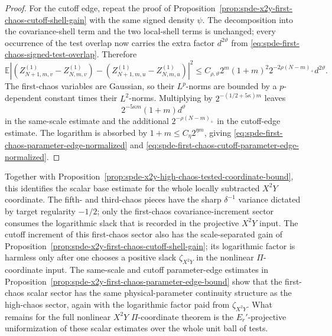 \begin{proof}
For the cutoff edge, repeat the proof of
Proposition~\ref{prop:spde-x2y-first-chaos-cutoff-shell-gain} with the same
signed density \(\psi\).  The decomposition into the covariance-shell term
and the two local-shell terms is unchanged; every occurrence of the test
overlap now carries the extra factor \(d^{2\vartheta}\) from
\eqref{eq:spde-first-chaos-signed-test-overlap}.  Therefore
\[
  \mathbb E
  \left|
      (Z_{N+1,m,v}^{(1)}-Z_{N,m,v}^{(1)})
      -(Z_{N+1,m,u}^{(1)}-Z_{N,m,u}^{(1)})
  \right|^2
  \leq
  C_{\rho,\vartheta}
  2^m(1+m)^2
  2^{-2\rho(N-m)_+}
  d^{2\vartheta}.
\]
The first-chaos variables are Gaussian, so their \(L^p\)-norms are bounded by
a \(p\)-dependent constant times their \(L^2\)-norms.  Multiplying by
\(2^{-(1/2+5\kappa)m}\) leaves
\[
  2^{-5\kappa m}(1+m)d^\vartheta
\]
in the same-scale estimate and the additional
\(2^{-\rho(N-m)_+}\) in the cutoff-edge estimate.  The logarithm is absorbed
by \(1+m\leq C_\eta2^{\eta m}\), giving
\eqref{eq:spde-first-chaos-parameter-edge-normalized} and
\eqref{eq:spde-first-chaos-cutoff-parameter-edge-normalized}.
\end{proof}

Together with
Proposition~\ref{prop:spde-x2y-high-chaos-tested-coordinate-bound}, this
identifies the scalar base estimate for the whole locally subtracted
\(X^2Y\) coordinate.  The fifth- and third-chaos pieces have the sharp
\(\delta^{-1}\) variance dictated by target regularity \(-1/2\); only the
first-chaos covariance-increment sector consumes the logarithmic slack that
is recorded in the projective \(X^2Y\) input.  The cutoff increment of this
first-chaos sector also has the scale-separated gain of
Proposition~\ref{prop:spde-x2y-first-chaos-cutoff-shell-gain}; its logarithmic
factor is harmless only after one chooses a positive slack
\(\zeta_{X^2Y}\) in the nonlinear \(\Pi\)-coordinate input.  The same-scale
and cutoff parameter-edge estimates in
Proposition~\ref{prop:spde-x2y-first-chaos-parameter-edge-bound} show that the
first-chaos scalar sector has the same physical-parameter continuity structure
as the high-chaos sector, again with the logarithmic factor paid from
\(\zeta_{X^2Y}\).  What remains for the full nonlinear
\(X^2Y\) \(\Pi\)-coordinate theorem is the \(E_r'\)-projective uniformization
of these scalar estimates over the whole unit ball of tests.

